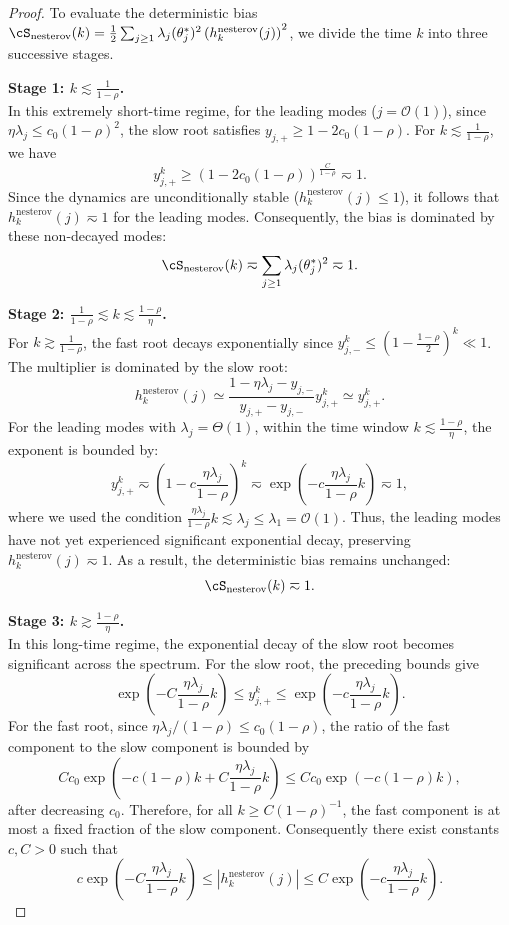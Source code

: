 \documentclass[11pt]{article}
\newcommand{\nesterov}{\mathrm{nesterov}}
\begin{document}
\begin{proof}
To evaluate the deterministic bias $\cS_{\nesterov}(k) = \frac12\sum_{j\ge1}\lambda_j(\theta_j^*)^2 \left(h_k^{\nesterov}(j)\right)^2$, we divide the time $k$ into three successive stages.

\textbf{Stage 1: $k \lesssim \frac{1}{1-\rho}$.} \\
In this extremely short-time regime, for the leading modes ($j=\mathcal{O}(1)$), since $\eta\lambda_j \le c_0(1-\rho)^2$, the slow root satisfies $y_{j,+} \ge 1 - 2c_0(1-\rho)$. For $k \lesssim \frac{1}{1-\rho}$, we have
\[
    y_{j,+}^k \ge \left(1 - 2c_0(1-\rho)\right)^{\frac{C}{1-\rho}} \eqsim 1.
\]
Since the dynamics are unconditionally stable ($h_k^{\nesterov}(j) \le 1$), it follows that $h_k^{\nesterov}(j) \eqsim 1$ for the leading modes. Consequently, the bias is dominated by these non-decayed modes:
\[
    \cS_{\nesterov}(k) \eqsim \sum_{j\ge1}\lambda_j(\theta_j^*)^2 \eqsim 1.
\]

\textbf{Stage 2: $\frac{1}{1-\rho} \lesssim k \lesssim \frac{1-\rho}{\eta}$.} \\
For $k \gtrsim \frac{1}{1-\rho}$, the fast root decays exponentially since $y_{j,-}^k \le \left(1-\frac{1-\rho}{2}\right)^k \ll 1$. The multiplier is  dominated by the slow root:
\[
    h_k^{\nesterov}(j) \simeq \frac{1-\eta\lambda_j - y_{j,-}}{y_{j,+} - y_{j,-}} y_{j,+}^k \simeq y_{j,+}^k.
\]
For the leading modes with $\lambda_j = \Theta(1)$, within the time window $k \lesssim \frac{1-\rho}{\eta}$, the exponent is bounded by:
\[
    y_{j,+}^k \eqsim \left(1 - c\frac{\eta\lambda_j}{1-\rho}\right)^k \eqsim \exp\left(-c\frac{\eta\lambda_j}{1-\rho}k\right) \eqsim 1,
\]
where we used the condition $\frac{\eta\lambda_j}{1-\rho}k \lesssim \lambda_j \le \lambda_1 = \mathcal{O}(1)$. Thus, the leading modes have not yet experienced significant exponential decay, preserving $h_k^{\nesterov}(j) \eqsim 1$. As a result, the deterministic bias remains unchanged:
\[
    \cS_{\nesterov}(k) \eqsim 1.
\]

\textbf{Stage 3: $k \gtrsim \frac{1-\rho}{\eta}$.} \\
In this long-time regime, the exponential decay of the slow root becomes significant across the spectrum. For the slow root, the preceding bounds give
\[
    \exp\left(-C\frac{\eta\lambda_j}{1-\rho}k\right)
    \le
    y_{j,+}^{k}
    \le
    \exp\left(-c\frac{\eta\lambda_j}{1-\rho}k\right).
\]
For the fast root, since \(\eta\lambda_j/(1-\rho)\le c_0(1-\rho)\), the ratio of the fast component to the slow component is bounded by
\[
    Cc_0
    \exp\left(-c(1-\rho)k+C\frac{\eta\lambda_j}{1-\rho}k\right)
    \le
    Cc_0\exp\left(-c(1-\rho)k\right),
\]
after decreasing \(c_0\).  Therefore, for all \(k\ge C(1-\rho)^{-1}\), the fast component is at most a fixed fraction of the slow component.  Consequently there exist constants \(c,C>0\) such that
\[
    c\exp\left(-C\frac{\eta\lambda_j}{1-\rho}k\right)
    \le
    \left|h_k^{\nesterov}(j)\right|
    \le
    C\exp\left(-c\frac{\eta\lambda_j}{1-\rho}k\right).
\]


\end{proof}
\end{document}
